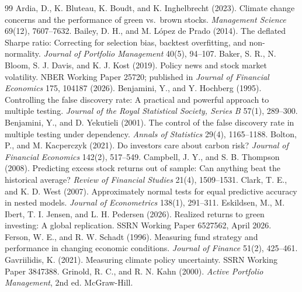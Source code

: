 \label{mainbody:end}
\clearpage
\begin{thebibliography}{99}
 Ardia, D., K. Bluteau, K. Boudt, and K. Inghelbrecht (2023). Climate change concerns and the performance of green vs.\ brown stocks. \textit{Management Science} 69(12), 7607--7632.
 Bailey, D. H., and M. L\'opez de Prado (2014). The deflated Sharpe ratio: Correcting for selection bias, backtest overfitting, and non-normality. \textit{Journal of Portfolio Management} 40(5), 94--107.
 Baker, S. R., N. Bloom, S. J. Davis, and K. J. Kost (2019). Policy news and stock market volatility. NBER Working Paper 25720; published in \textit{Journal of Financial Economics} 175, 104187 (2026).
 Benjamini, Y., and Y. Hochberg (1995). Controlling the false discovery rate: A practical and powerful approach to multiple testing. \textit{Journal of the Royal Statistical Society, Series B} 57(1), 289--300.
 Benjamini, Y., and D. Yekutieli (2001). The control of the false discovery rate in multiple testing under dependency. \textit{Annals of Statistics} 29(4), 1165--1188.
 Bolton, P., and M. Kacperczyk (2021). Do investors care about carbon risk? \textit{Journal of Financial Economics} 142(2), 517--549.
 Campbell, J. Y., and S. B. Thompson (2008). Predicting excess stock returns out of sample: Can anything beat the historical average? \textit{Review of Financial Studies} 21(4), 1509--1531.
 Clark, T. E., and K. D. West (2007). Approximately normal tests for equal predictive accuracy in nested models. \textit{Journal of Econometrics} 138(1), 291--311.
 Eskildsen, M., M. Ibert, T. I. Jensen, and L. H. Pedersen (2026). Realized returns to green investing: A global replication. SSRN Working Paper 6527562, April 2026.
 Ferson, W. E., and R. W. Schadt (1996). Measuring fund strategy and performance in changing economic conditions. \textit{Journal of Finance} 51(2), 425--461.
 Gavriilidis, K. (2021). Measuring climate policy uncertainty. SSRN Working Paper 3847388.
 Grinold, R. C., and R. N. Kahn (2000). \textit{Active Portfolio Management}, 2nd ed. McGraw-Hill.

\end{thebibliography}
